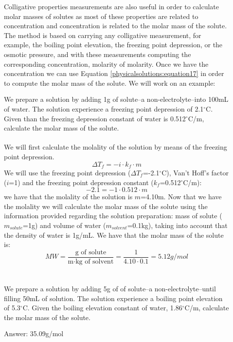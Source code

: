 \documentclass[main.tex]{subfiles}
\newcommand\chapterlabel{physicalsolutions}
\begin{document}
\begin{description}
\item[] 
Colligative properties measurements are also useful in order to calculate molar masses of solutes as most of these properties are related to concentration and concentration is related to the molar mass of the solute. The method is based on carrying any colligative measurement, for example, the boiling point elevation, the freezing point depression, or the osmotic pressure, and with these measurements computing the corresponding concentration, molarity of molarity. Once we have the concentration we can use Equation \ref{\chapterlabel:equation17} in order to compute the molar mass of the solute. We will work on an example:
\begin{example} %
We prepare a solution by adding 1g of solute--a non-electrolyte--into 100mL of water. The solution experience a freezing point depression of 2.1$^{\circ}$C. Given than the freezing depression constant of water is 0.512$^{\circ}$C/m, calculate the molar mass of the solute.
\\
 \\
We will first calculate the molality of the solution by means of the freezing point depression. 
\[\Delta T_f =-i\cdot k_f\cdot m\]
We will use the freezing point depression ($\Delta T_f $=-2.1$^{\circ}$C), Van't Hoff's factor ($i$=1) and the freezing point depression constant ($k_f$=0.512$^{\circ}$C/m):
\[-2.1 =-1\cdot 0.512\cdot m\]
we have that the molality of the solution is $m$=4.10m. Now that we have the molality we will calculate the molar mass of the solute using the information provided regarding the solution preparation: mass of solute ($m_{solute}$=1g) and volume of water ($m_{solvent}$=0.1kg), taking into account that the density of water is 1g/mL. We have that the molar mass of the solute is:
\[MW=\frac{ \text{g of solute}   }{\text{m}\cdot \text{kg of solvent}   	}=\frac{1}{4.10\cdot 0.1}=5.12g/mol\]
\\
\faDiamond\ \\
We prepare a solution by adding 5g of of solute--a non-electrolyte--until filling 50mL of solution. The solution experience a boiling point elevation of 5.3$^{\circ}$C. Given the boiling elevation constant of water, 1.86$^{\circ}$C/m, calculate the molar mass of the solute.
\\
\begin{flushright} Answer: 35.09g/mol\end{flushright}
\end{example}%
    
    
    
    
\end{description}
\end{document}
